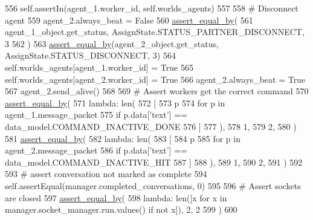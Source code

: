\begin{DoxyCode}
556         self.assertIn(agent\_1.worker\_id, self.worlds\_agents)
557 
558         \textcolor{comment}{# Disconnect agent}
559         agent\_2.always\_beat = \textcolor{keyword}{False}
560         \hyperlink{namespaceparlai_1_1mturk_1_1core_1_1test_1_1test__full__system_a0b463246d35658a2e422010f13dcf819}{assert\_equal\_by}(
561             agent\_1\_object.get\_status, AssignState.STATUS\_PARTNER\_DISCONNECT, 3
562         )
563         \hyperlink{namespaceparlai_1_1mturk_1_1core_1_1test_1_1test__full__system_a0b463246d35658a2e422010f13dcf819}{assert\_equal\_by}(agent\_2\_object.get\_status, AssignState.STATUS\_DISCONNECT, 3)
564         self.worlds\_agents[agent\_1.worker\_id] = \textcolor{keyword}{True}
565         self.worlds\_agents[agent\_2.worker\_id] = \textcolor{keyword}{True}
566         agent\_2.always\_beat = \textcolor{keyword}{True}
567         agent\_2.send\_alive()
568 
569         \textcolor{comment}{# Assert workers get the correct command}
570         \hyperlink{namespaceparlai_1_1mturk_1_1core_1_1test_1_1test__full__system_a0b463246d35658a2e422010f13dcf819}{assert\_equal\_by}(
571             \textcolor{keyword}{lambda}: len(
572                 [
573                     p
574                     \textcolor{keywordflow}{for} p \textcolor{keywordflow}{in} agent\_1.message\_packet
575                     \textcolor{keywordflow}{if} p.data[\textcolor{stringliteral}{'text'}] == data\_model.COMMAND\_INACTIVE\_DONE
576                 ]
577             ),
578             1,
579             2,
580         )
581         \hyperlink{namespaceparlai_1_1mturk_1_1core_1_1test_1_1test__full__system_a0b463246d35658a2e422010f13dcf819}{assert\_equal\_by}(
582             \textcolor{keyword}{lambda}: len(
583                 [
584                     p
585                     \textcolor{keywordflow}{for} p \textcolor{keywordflow}{in} agent\_2.message\_packet
586                     \textcolor{keywordflow}{if} p.data[\textcolor{stringliteral}{'text'}] == data\_model.COMMAND\_INACTIVE\_HIT
587                 ]
588             ),
589             1,
590             2,
591         )
592 
593         \textcolor{comment}{# assert conversation not marked as complete}
594         self.assertEqual(manager.completed\_conversations, 0)
595 
596         \textcolor{comment}{# Assert sockets are closed}
597         \hyperlink{namespaceparlai_1_1mturk_1_1core_1_1test_1_1test__full__system_a0b463246d35658a2e422010f13dcf819}{assert\_equal\_by}(
598             \textcolor{keyword}{lambda}: len([x \textcolor{keywordflow}{for} x \textcolor{keywordflow}{in} manager.socket\_manager.run.values() \textcolor{keywordflow}{if} \textcolor{keywordflow}{not} x]), 2, 2
599         )
600 
\end{DoxyCode}
